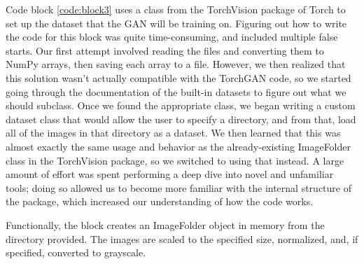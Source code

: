 \documentclass[11pt,letterpaper]{article}
\begin{document}
		Code block \ref{code:block3} uses a class from the TorchVision package of Torch to set up the dataset that the GAN will be training on.
		Figuring out how to write the code for this block was quite time-consuming, and included multiple false starts.
		Our first attempt involved reading the files and converting them to NumPy arrays, then saving each array to a file.
		However, we then realized that this solution wasn't actually compatible with the TorchGAN code, so we started going through the documentation of the built-in datasets to figure out what we should subclass.
		Once we found the appropriate class, we began writing a custom dataset class that would allow the user to specify a directory, and from that, load all of the images in that directory as a dataset.
		We then learned that this was almost exactly the same usage and behavior as the already-existing ImageFolder class in the TorchVision package, so we switched to using that instead.
		A large amount of effort was spent performing a deep dive into novel and unfamiliar tools; doing so allowed us to become more familiar with the internal structure of the package, which increased our understanding of how the code works.

		Functionally, the block creates an ImageFolder object in memory from the directory provided.
		The images are scaled to the specified size, normalized, and, if specified, converted to grayscale.
\end{document}
